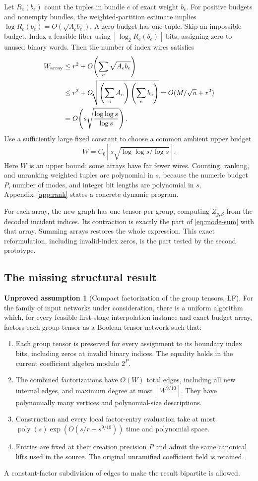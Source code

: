 \documentclass[11pt]{article}
\theoremstyle{definition}
\newtheorem{assumption}[theorem]{Unproved assumption}
\theoremstyle{remark}
\newcommand{\poly}{\operatorname{poly}}
\newcommand{\ceil}[1]{\left\lceil #1\right\rceil}
\begin{document}
Let $R_e(b_e)$ count the tuples in bundle $e$ of exact weight $b_e$.
For positive budgets and nonempty bundles, the weighted-partition estimate
implies $\log R_e(b_e)=O(\sqrt{A_eb_e})$. A zero budget has one tuple.
Skip an impossible budget. Index a feasible fiber using
$\ceil{\log_2R_e(b_e)}$ bits, assigning zero to unused binary words.
Then the number of index wires satisfies
\begin{align}
 W_{\rm array}
 &\le r^2+O\!\left(\sum_e\sqrt{A_eb_e}\right)\notag\\
 &\le r^2+O\!\sqrt{\left(\sum_eA_e\right)\left(\sum_eb_e\right)}
 =O(M/\sqrt u+r^2)\notag\\
 &=O\!\left(s\sqrt{\frac{\log\log s}{\log s}}\right).
 \label{eq:compressed-wires}
\end{align}
Use a sufficiently large fixed constant to choose a common ambient upper
budget
\[
 W=C_0\ceil{s\sqrt{\log\log s/\log s}}.
\]
Here $W$ is an upper bound; some arrays have far fewer wires. Counting,
ranking, and unranking weighted tuples are polynomial in $s$, because the
numeric budget $P$, number of modes, and integer bit lengths are polynomial
in $s$. Appendix~\ref{app:rank} states a concrete dynamic program.

For each array, the new graph has one tensor per group, computing
$Z_{g,\beta}$ from the decoded incident indices. Its contraction is exactly
the part of \eqref{eq:mode-sum} with that array. Summing arrays restores the
whole expression. This exact reformulation, including invalid-index zeros,
is the part tested by the second prototype.

\subsection{The missing structural result}
\begin{assumption}[Compact factorization of the group tensors, LF]\label{ass:LF}
For the family of input networks under consideration, there is a uniform
algorithm which, for every feasible first-stage interpolation instance and
exact budget array, factors each group tensor as a Boolean tensor network
such that:
\begin{enumerate}[label=(\roman*)]
\item Each group tensor is preserved for every assignment to its boundary
index bits, including zeros at invalid binary indices. The equality holds in
the current coefficient algebra modulo $2^P$.
\item The combined factorizations have $O(W)$ total edges, including all
new internal edges, and maximum degree at most $\ceil{W^{9/10}}$.
They have polynomially many vertices and polynomial-size descriptions.
\item Construction and every local factor-entry evaluation take at most
$\poly(s)\exp(O(s/r+s^{9/10}))$ time and polynomial space.
\item Entries are fixed at their creation precision $P$ and admit the same
canonical lifts used in the source. The original unramified coefficient field
is retained.
\end{enumerate}
A constant-factor subdivision of edges to make the result bipartite is allowed.
\end{assumption}
\end{document}
